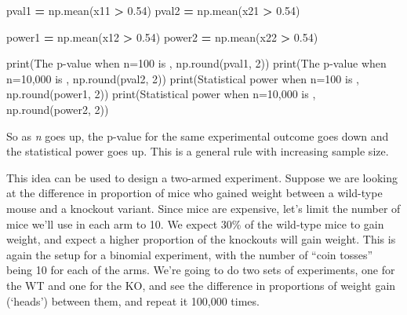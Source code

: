 \documentclass[
  letterpaper,
]{scrbook}
\newenvironment{Shaded}{\begin{snugshade}}{\end{snugshade}}
\newcommand{\BuiltInTok}[1]{#1}
\newcommand{\DecValTok}[1]{\textcolor[rgb]{0.00,0.00,0.81}{#1}}
\newcommand{\FloatTok}[1]{\textcolor[rgb]{0.00,0.00,0.81}{#1}}
\newcommand{\NormalTok}[1]{#1}
\newcommand{\OperatorTok}[1]{\textcolor[rgb]{0.81,0.36,0.00}{\textbf{#1}}}
\newcommand{\StringTok}[1]{\textcolor[rgb]{0.31,0.60,0.02}{#1}}
\begin{document}
\begin{Shaded}
\begin{Highlighting}[]
\NormalTok{pval1 }\OperatorTok{=}\NormalTok{ np.mean(x11 }\OperatorTok{\textgreater{}} \FloatTok{0.54}\NormalTok{)}
\NormalTok{pval2 }\OperatorTok{=}\NormalTok{ np.mean(x21 }\OperatorTok{\textgreater{}} \FloatTok{0.54}\NormalTok{)}

\NormalTok{power1 }\OperatorTok{=}\NormalTok{ np.mean(x12 }\OperatorTok{\textgreater{}} \FloatTok{0.54}\NormalTok{)}
\NormalTok{power2 }\OperatorTok{=}\NormalTok{ np.mean(x22 }\OperatorTok{\textgreater{}} \FloatTok{0.54}\NormalTok{)}

\BuiltInTok{print}\NormalTok{(}\StringTok{\textquotesingle{}The p{-}value when n=100 is \textquotesingle{}}\NormalTok{, np.}\BuiltInTok{round}\NormalTok{(pval1, }\DecValTok{2}\NormalTok{))}
\BuiltInTok{print}\NormalTok{(}\StringTok{\textquotesingle{}The p{-}value when n=10,000 is \textquotesingle{}}\NormalTok{, np.}\BuiltInTok{round}\NormalTok{(pval2, }\DecValTok{2}\NormalTok{))}
\BuiltInTok{print}\NormalTok{(}\StringTok{\textquotesingle{}Statistical power when n=100 is \textquotesingle{}}\NormalTok{, np.}\BuiltInTok{round}\NormalTok{(power1, }\DecValTok{2}\NormalTok{))}
\BuiltInTok{print}\NormalTok{(}\StringTok{\textquotesingle{}Statistical power when n=10,000 is \textquotesingle{}}\NormalTok{, np.}\BuiltInTok{round}\NormalTok{(power2, }\DecValTok{2}\NormalTok{))}
\end{Highlighting}
\end{Shaded}

So as \emph{n} goes up, the p-value for the same experimental outcome goes down and the statistical power goes up. This is a general rule with increasing sample size.

This idea can be used to design a two-armed experiment. Suppose we are looking at the difference in proportion of mice who gained weight between a wild-type mouse and a knockout variant. Since mice are expensive, let's limit the number of mice we'll use in each arm to 10. We expect 30\% of the wild-type mice to gain weight, and expect a higher proportion of the knockouts will gain weight. This is again the setup for a binomial experiment, with the number of ``coin tosses'' being 10 for each of the arms. We're going to do two sets of experiments, one for the WT and one for the KO, and see the difference in proportions of weight gain (`heads') between them, and repeat it 100,000 times.
\end{document}
